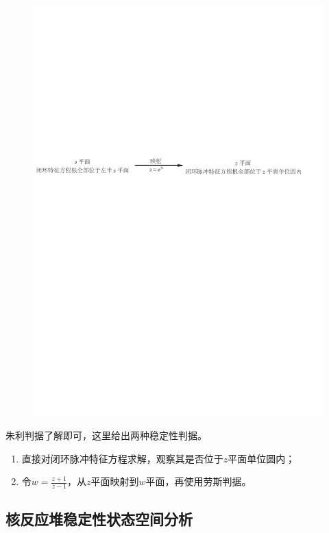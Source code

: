 \begin{figure}[H]
    \centering
    \includegraphics[scale=0.7]{figures/figure5.1.pdf}
\end{figure}

朱利判据了解即可，这里给出两种稳定性判据。

\begin{enumerate}
    \item 直接对闭环脉冲特征方程求解，观察其是否位于$z$平面单位圆内；
    \item 令$w = \frac{z+1}{z-1}$，从$z$平面映射到$w$平面，再使用劳斯判据。
\end{enumerate}

\subsection{核反应堆稳定性状态空间分析}

